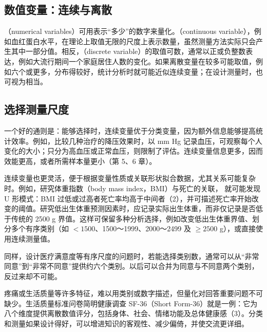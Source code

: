 \subsection{数值变量：连续与离散}
（numerical variables）可用表示“多少”的数字来量化。（continuous variable），例如血红蛋白水平，在理论上取值无限的尺度上表示数量，虽然测量方法实际只会产生其中一部分值。相反，（discrete variable）的取值可数，通常以正或负整数表达，例如大流行期间一个家庭居住人数的变化。如果离散变量在较多可能取值，例如六个或更多，分布得较好，统计分析时就可能近似连续变量；在设计测量时，也可视为相当。

\subsection{选择测量尺度}
一个好的通则是：能够选择时，连续变量优于分类变量，因为额外信息能够提高统计效率。例如，比较几种治疗的降压效果时，以 mm Hg 记录血压，可观察每个人变化的大小；只分为高血压或正常血压，则限制了评估。连续变量信息更多，因而效能更高，或者所需样本量更小（第 5、6 章）。

连续变量也更灵活，便于根据变量性质或关联形状拟合数据，尤其关系可能复杂时。例如，研究体重指数（body mass index，BMI）与死亡的关联，
就可能发现 U 形模式：BMI 过低或过高者死亡率均高于中间者（2），并可描述死亡率开始改变的阈值。研究低出生体重预测因素时，应记录实际出生体重，而非仅记录是否低于传统的 2500 g 界值。这样可保留多种分析选择，例如改变低出生体重界值、划分多个有序类别（如 $<1500$、1500～1999、2000～2499 及 $\geq2500$ g），或直接使用连续测量值。

同样，设计医疗满意度等有序尺度的问题时，若能选择类别数，通常可以从“非常同意”到“非常不同意”提供约六个类别。以后可以合并为同意与不同意两个类别，反过来却不可能。

疼痛或生活质量等许多特征，难以用类别或数字描述，但量化对回答重要问题不可缺少。生活质量标准问卷简明健康调查 SF-36（Short Form-36）就是一例：它为八个维度提供离散数值评分，包括身体、社会、情绪功能及总体健康感（3）。分类和测量如果设计得好，可以增进知识的客观性、减少偏倚，并使交流更详细。

